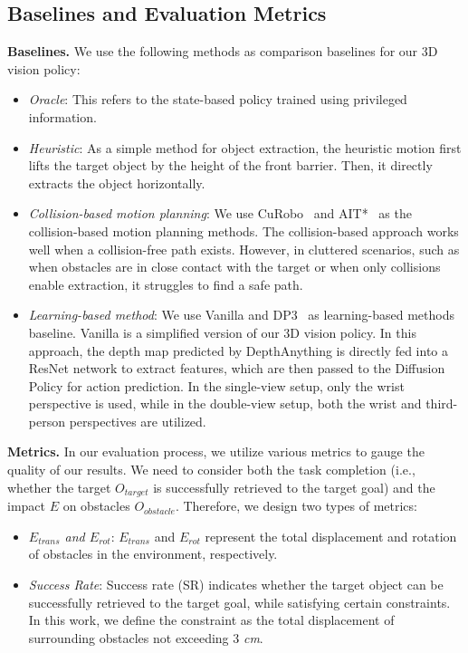 \subsection{Baselines and Evaluation Metrics}
\textbf{Baselines.} We use the following methods as comparison baselines for our 3D vision policy:
\begin{itemize}
    \item \textit{Oracle}: This refers to the state-based policy trained using privileged information.
    \item \textit{Heuristic}: As a simple method for object extraction, the heuristic motion first lifts the target object by the height of the front barrier. Then, it directly extracts the object horizontally.
    \item \textit{Collision-based motion planning}: We use CuRobo~\cite{sundaralingam2023curobo} and AIT*~\cite{strub2020adaptively} as the collision-based motion planning methods. The collision-based approach works well when a collision-free path exists. However, in cluttered scenarios, such as when obstacles are in close contact with the target or when only collisions enable extraction, it struggles to find a safe path.
    \item \textit{Learning-based method}: We use Vanilla and DP3~\cite{ze20243d} as learning-based methods baseline. Vanilla is a simplified version of our 3D vision policy. In this approach, the depth map predicted by DepthAnything is directly fed into a ResNet network to extract features, which are then passed to the Diffusion Policy for action prediction. In the single-view setup, only the wrist perspective is used, while in the double-view setup, both the wrist and third-person perspectives are utilized.

\end{itemize}

\textbf{Metrics.} In our evaluation process, we utilize various metrics to gauge the quality of our results. We need to consider both the task completion (i.e., whether the target $O_{target}$ is successfully retrieved to the target goal) and the impact $E$ on obstacles $O_{obstacle}$. Therefore, we design two types of metrics:
\begin{itemize}
    \item \textit{$E_{trans}$ and $E_{rot}$}: $E_{trans}$ and $E_{rot}$ represent the total displacement and rotation of obstacles in the environment, respectively.
    \item \textit{Success Rate}: Success rate (SR) indicates whether the target object can be successfully retrieved to the target goal, while satisfying certain constraints. In this work, we define the constraint as the total displacement of surrounding obstacles not exceeding 3 \textit{cm}.
\end{itemize}

